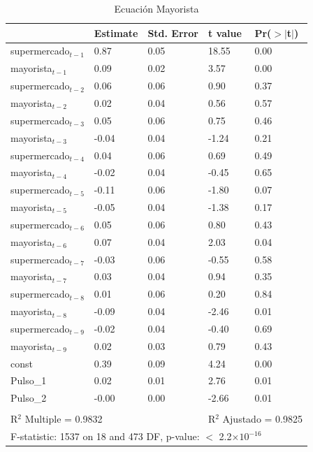 \documentclass[12pt, twoside]{book}\usepackage[]{graphicx}\usepackage[]{color}
\numberwithin{equation}{section}
\numberwithin{theorem}{section}
\numberwithin{teorema}{section}
\numberwithin{defi}{section}
\numberwithin{prop}{section}
\numberwithin{defi}{section}
\theoremstyle{plain}
\begin{document}
\begin{table}[h]
\centering
\caption{Ecuación Mayorista}
\begin{tabular}{lllll}
  \hline
 & Estimate & Std. Error & t value & Pr($>$$|$t$|$) \\ 
  \hline
supermercado$_{t-1}$ & 0.87 & 0.05 & 18.55 & 0.00 \\ 
  mayorista$_{t-1}$ & 0.09 & 0.02 & 3.57 & 0.00 \\ 
  supermercado$_{t-2}$ & 0.06 & 0.06 & 0.90 & 0.37 \\ 
  mayorista$_{t-2}$ & 0.02 & 0.04 & 0.56 & 0.57 \\ 
  supermercado$_{t-3}$ & 0.05 & 0.06 & 0.75 & 0.46 \\ 
  mayorista$_{t-3}$ & -0.04 & 0.04 & -1.24 & 0.21 \\ 
  supermercado$_{t-4}$ & 0.04 & 0.06 & 0.69 & 0.49 \\ 
  mayorista$_{t-4}$ & -0.02 & 0.04 & -0.45 & 0.65 \\ 
  supermercado$_{t-5}$ & -0.11 & 0.06 & -1.80 & 0.07 \\ 
  mayorista$_{t-5}$ & -0.05 & 0.04 & -1.38 & 0.17 \\ 
  supermercado$_{t-6}$ & 0.05 & 0.06 & 0.80 & 0.43 \\ 
  mayorista$_{t-6}$ & 0.07 & 0.04 & 2.03 & 0.04 \\ 
  supermercado$_{t-7}$ & -0.03 & 0.06 & -0.55 & 0.58 \\ 
  mayorista$_{t-7}$ & 0.03 & 0.04 & 0.94 & 0.35 \\ 
  supermercado$_{t-8}$ & 0.01 & 0.06 & 0.20 & 0.84 \\ 
  mayorista$_{t-8}$ & -0.09 & 0.04 & -2.46 & 0.01 \\ 
  supermercado$_{t-9}$ & -0.02 & 0.04 & -0.40 & 0.69 \\ 
  mayorista$_{t-9}$ & 0.02 & 0.03 & 0.79 & 0.43 \\ 
  const & 0.39 & 0.09 & 4.24 & 0.00 \\ 
  Pulso\_1 & 0.02 & 0.01 & 2.76 & 0.01 \\ 
  Pulso\_2 & -0.00 & 0.00 & -2.66 & 0.01 \\ 
  \midrule \\ 
\multicolumn{2}{l}{R$^{2}$ Multiple = 0.9832} & &  \multicolumn{2}{l}{R$^{2}$ Ajustado = 0.9825} \\
\multicolumn{5}{l}{F-statistic: 1537 on 18 and 473 DF,  p-value: $<$ 2.2$\times 10^{-16}$} \\
   \bottomrule
\end{tabular}
\end{table}
\end{document}

